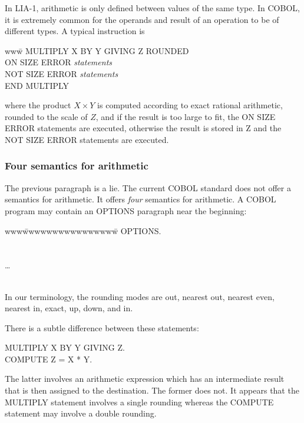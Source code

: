 \documentclass{article}
\begin{document}
In LIA-1, arithmetic is only defined between values of the
same type.  In COBOL, it is extremely common for the
operands and result of an operation to be of different types.
A typical instruction is
\begin{tabbing}
www\=\kill
MULTIPLY X BY Y GIVING Z ROUNDED\\
\> ON SIZE ERROR {\it statements}\\
\>  NOT SIZE ERROR {\it statements}\\
END MULTIPLY  
\end{tabbing}
\noindent where the product $X\times Y$ is computed
according to exact rational arithmetic, rounded to the
scale of $Z$, and if the result is too large to fit,
the ON SIZE ERROR statements are executed, otherwise
the result is stored in Z and the NOT SIZE ERROR
statements are executed.

\subsubsection{Four semantics for arithmetic}

The previous paragraph is a lie.  The current COBOL standard does not
offer a semantics for arithmetic.  It offers {\it four} semantics for
arithmetic.  A COBOL program may contain an OPTIONS paragraph near
the beginning:
\begin{tabbing}
www\=wwwwwwwwwwwwwwww\=\kill
OPTIONS.\\
\\
\\
\> \dots\\
\\
\end{tabbing}

In our terminology, the rounding modes are out, nearest out,
nearest even, nearest in, exact, up, down, and in.

There is a subtle difference between these statements:
\begin{tabbing}
MULTIPLY X BY Y GIVING Z.\\
COMPUTE Z = X * Y.
\end{tabbing}
The latter involves an arithmetic expression which has an
intermediate result that is then assigned to the destination.
The former does not.  It appears that the MULTIPLY statement
involves a single rounding whereas the COMPUTE statement may
involve a double rounding.
\end{document}
